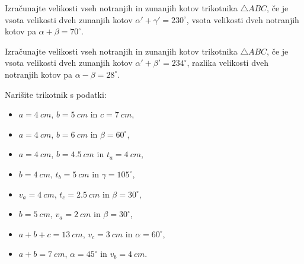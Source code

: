 \begin{naloga}
\begin{figure}[H]

                \end{figure}
            \end{naloga}
                
        
            \begin{naloga}
                Izračunajte velikosti vseh notranjih in zunanjih kotov trikotnika $\triangle ABC$, 
                če je vsota velikosti dveh zunanjih kotov $\alpha'+\gamma'=230^\circ$, vsota velikosti dveh notranjih kotov pa $\alpha+\beta=70^\circ$.
            \end{naloga}

            \begin{naloga}
                Izračunajte velikosti vseh notranjih in zunanjih kotov trikotnika $\triangle ABC$, 
                če je vsota velikosti dveh zunanjih kotov $\alpha'+\beta'=234^\circ$, razlika velikosti dveh notranjih kotov pa $\alpha-\beta=28^\circ$.
            \end{naloga}

    
            \begin{naloga}
                Narišite trikotnik s podatki:
                \begin{itemize}
                    \item $a=4~cm$, $b=5~cm$ in $c=7~cm$,
                    \item $a=4~cm$, $b=6~cm$ in $\beta=60^\circ$,
                    \item $a=4~cm$, $b=4.5~cm$ in $t_a=4~cm$,
                    \item $b=4~cm$, $t_b=5~cm$ in $\gamma=105^\circ$,
                    \item $v_a=4~cm$, $t_c=2.5~cm$ in $\beta=30^\circ$,
                    \item $b=5~cm$, $v_a=2~cm$ in $\beta=30^\circ$,
                    \item $a+b+c=13~cm$, $v_c=3~cm$ in $\alpha=60^\circ$,
                    \item $a+b=7~cm$, $\alpha=45^\circ$ in $v_b=4~cm$.
                \end{itemize}
            \end{naloga}
        


